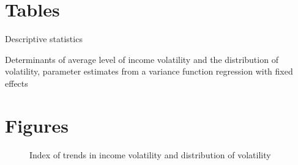 \documentclass[12pt]{article}
\begin{document}
\clearpage
\section{Tables}

\begin{table}[!ht]
    \caption{Descriptive statistics}
    \begin{center}
    \resizebox{\textwidth}{!}{}
    \label{descriptives}
    \end{center}
\end{table}

\begin{table}[!ht]
    \caption{Determinants of average level of income volatility and the distribution of volatility, parameter estimates from a variance function regression with fixed effects}
    \begin{center}
    \resizebox{\textwidth}{!}{}
    \label{vfr_fe}
    \end{center}
\end{table}

\clearpage
\section{Figures}

\begin{figure}[htp!]
    \centering
    \caption{Index of trends in income volatility and distribution of volatility}
    \label{index_volatility}
\end{figure}
\end{document}

